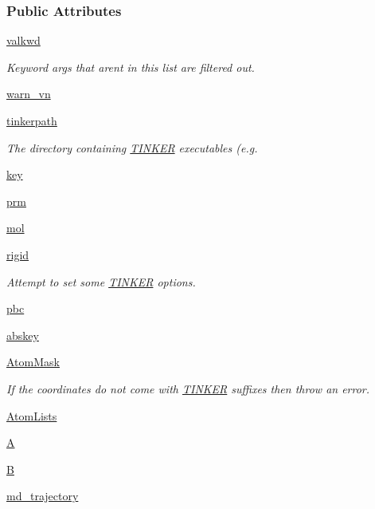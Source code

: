 \subsubsection*{Public Attributes}
\begin{DoxyCompactItemize}
\item 
\hyperlink{classsrc_1_1tinkerio_1_1TINKER_a5e0c3f1a0834a4c6f3239a59901cd040}{valkwd}
\begin{DoxyCompactList}\small\item\em Keyword args that aren\textquotesingle{}t in this list are filtered out. \end{DoxyCompactList}\item 
\hyperlink{classsrc_1_1tinkerio_1_1TINKER_a504b2ebca5c7f2797aa213c5a38002af}{warn\+\_\+vn}
\item 
\hyperlink{classsrc_1_1tinkerio_1_1TINKER_a8625afea305c83c9a8505f42c0f045ae}{tinkerpath}
\begin{DoxyCompactList}\small\item\em The directory containing \hyperlink{classsrc_1_1tinkerio_1_1TINKER}{T\+I\+N\+K\+ER} executables (e.\+g. \end{DoxyCompactList}\item 
\hyperlink{classsrc_1_1tinkerio_1_1TINKER_aa1186969c31ca79849f82fe4fd6babc5}{key}
\item 
\hyperlink{classsrc_1_1tinkerio_1_1TINKER_aaffe954cc7e2c94ec3aa8cffd62710d2}{prm}
\item 
\hyperlink{classsrc_1_1tinkerio_1_1TINKER_a7e289d80130b39f2974f5b896cb4f695}{mol}
\item 
\hyperlink{classsrc_1_1tinkerio_1_1TINKER_add22ce1946dd0ae635ce0a86e7f69818}{rigid}
\begin{DoxyCompactList}\small\item\em Attempt to set some \hyperlink{classsrc_1_1tinkerio_1_1TINKER}{T\+I\+N\+K\+ER} options. \end{DoxyCompactList}\item 
\hyperlink{classsrc_1_1tinkerio_1_1TINKER_ac4f3fc8871832348c61e63d9ef5862a2}{pbc}
\item 
\hyperlink{classsrc_1_1tinkerio_1_1TINKER_af443c0094aa207f8d58dded4cc2b5d06}{abskey}
\item 
\hyperlink{classsrc_1_1tinkerio_1_1TINKER_ac2bb4920677bde45915c43096ea3663a}{Atom\+Mask}
\begin{DoxyCompactList}\small\item\em If the coordinates do not come with \hyperlink{classsrc_1_1tinkerio_1_1TINKER}{T\+I\+N\+K\+ER} suffixes then throw an error. \end{DoxyCompactList}\item 
\hyperlink{classsrc_1_1tinkerio_1_1TINKER_a0843c5091e79e2c1cf334d0ad0f4f6cc}{Atom\+Lists}
\item 
\hyperlink{classsrc_1_1tinkerio_1_1TINKER_ab2f12e3543609cadec30abf362e0c883}{A}
\item 
\hyperlink{classsrc_1_1tinkerio_1_1TINKER_a331d0a44302cacd6a0034524f06c01ab}{B}
\item 
\hyperlink{classsrc_1_1tinkerio_1_1TINKER_a558cb6da144aa7afa7bf780b6236790e}{md\+\_\+trajectory}
\end{DoxyCompactItemize}


